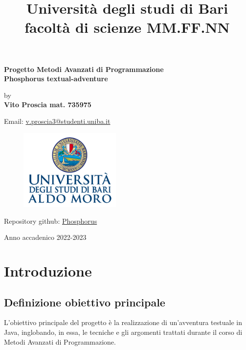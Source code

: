 \documentclass[italian,12pt,a4paper]{article}
\title{Università degli studi di Bari facoltà di scienze MM.FF.NN}
\date{} %
\begin{document}
	\maketitle
	\thispagestyle{empty}
	\begin{center}
		\huge	\textbf{Progetto Metodi Avanzati di Programmazione} \\
		\vspace{20px}
		\Large \textbf{Phosphorus textual-adventure}
	\end{center}
	
	\begin{center}
		by \\
		\Large \textbf{Vito Proscia mat. 735975} \\
	\end{center}
	\vspace{5px}
	\begin{center}
		Email: \href{mailto:v.proscia3@studenti.uniba.it}{v.proscia3@studenti.uniba.it}
	\end{center}
	\vspace{30px}
	\begin{figure}[hb]
		\centering
		\includegraphics[width=5cm]{image.png}
	\end{figure}
	\vspace{50px}
	\begin{center}
		Repository github: \href{https://github.com/Giut0/Phosphorus}{Phosphorus}
	\end{center}
	
	\vfill
	\begin{center}
		Anno accadenico 2022-2023
	\end{center}
	
	\newpage
	
	\tableofcontents
	
	\newpage
	
	\section{Introduzione}
	\subsection{Definizione obiettivo principale}
	L'obiettivo principale del progetto è la realizzazione di un'avventura testuale in Java, inglobando, in essa, le tecniche e gli argomenti trattati durante il corso di Metodi Avanzati di Programmazione.
\end{document}
